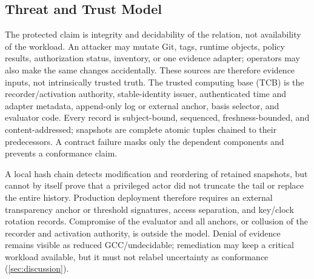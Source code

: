 \subsection{Threat and Trust Model}
The protected claim is integrity and decidability of the relation, not
availability of the workload. An attacker may mutate Git, tags, runtime
objects, policy results, authorization status, inventory, or one evidence
adapter; operators may also make the same changes accidentally. These sources
are therefore evidence inputs, not intrinsically trusted truth. The trusted
computing base (TCB) is the recorder/activation authority, stable-identity
issuer, authenticated time and adapter metadata, append-only log or external
anchor, basis selector, and evaluator code. Every record is subject-bound,
sequenced, freshness-bounded, and content-addressed; snapshots are complete
atomic tuples chained to their predecessors. A contract failure masks only
the dependent components and prevents a conformance claim.

A local hash chain detects modification and reordering of retained snapshots,
but cannot by itself prove that a privileged actor did not truncate the tail
or replace the entire history. Production deployment therefore requires an
external transparency anchor or threshold signatures, access separation, and
key/clock rotation records. Compromise of the evaluator and all anchors, or
collusion of the recorder and activation authority, is outside the model.
Denial of evidence remains visible as reduced GCC/undecidable; remediation may
keep a critical workload available, but it must not relabel uncertainty as
conformance (\cref{sec:discussion}).

